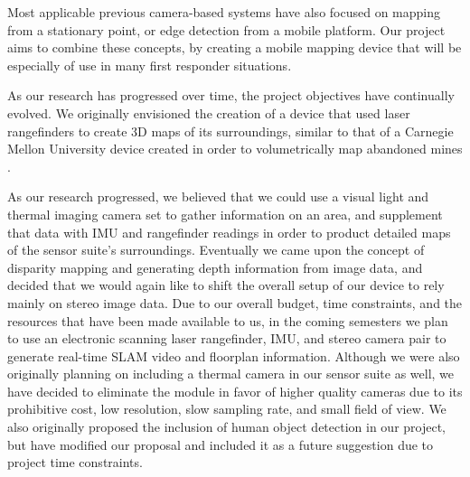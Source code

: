 Most applicable previous camera-based systems have also focused on mapping from a stationary point, or edge detection from a mobile platform. Our project aims to combine these concepts, by creating a mobile mapping device that will be especially of use in many first responder situations.
\par
As our research has progressed over time, the project objectives have continually evolved. We originally envisioned the creation of a device that used laser rangefinders to create 3D maps of its surroundings, similar to that of a Carnegie Mellon University device created in order to volumetrically map abandoned mines \cite{thrun}.
\par
As our research progressed, we believed that we could use a visual light and thermal imaging camera set to gather information on an area, and supplement that data with IMU and rangefinder readings in order to product detailed maps of the sensor suite's surroundings. Eventually we came upon the concept of disparity mapping and generating depth information from image data, and decided that we would again like to shift the overall setup of our device to rely mainly on stereo image data. Due to our overall budget, time constraints, and the resources that have been made available to us, in the coming semesters we plan to use an electronic scanning laser rangefinder, IMU, and stereo camera pair to generate real-time SLAM video and floorplan information. Although we were also originally planning on including a thermal camera in our sensor suite as well, we have decided to eliminate the module in favor of higher quality cameras due to its prohibitive cost, low resolution, slow sampling rate, and small field of view. We also originally proposed the inclusion of human object detection in our project, but have modified our proposal and included it as a future suggestion due to project time constraints.





